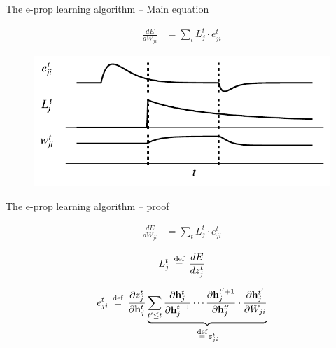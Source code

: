 \documentclass[t]{beamer}
\newcommand\eqdef{\ \mathrel{\overset{\makebox[0pt]{\mbox{\normalfont\scriptsize\rmfamily def}}}{=}}\ }
\begin{document}
\begin{frame}{The e-prop learning algorithm -- Main equation}
	
	\begin{align*}
		\frac{dE}{dW_{ji}} 
		&= \sum_tL_j^t \cdot e_{ji}^t
	\end{align*}
	
	\begin{figure}[!ht]
		\includegraphics[width=0.8\linewidth]{eligibility.pdf}
	\end{figure}
	
\end{frame}

\begin{frame}{The e-prop learning algorithm -- proof}
	
	\begin{align*}
		\frac{dE}{dW_{ji}} 
		&= \sum_tL_j^t \cdot e_{ji}^t
	\end{align*}
	
	\begin{equation*}
L^t_j \eqdef \frac{dE}{dz^t_j}
\end{equation*}

	\begin{equation*}
e^t_{ji} \eqdef \frac{\partial z_j^t}{\partial\mathbf{h}_j^t}\underbrace{\sum_{t'\leq t}\frac{\partial\mathbf{h}^t_j}{\partial\mathbf{h}_j^{t-1}} \cdots \frac{\partial\mathbf{h}_j^{t'+1}}{\partial\mathbf{h}_j^{t'}}\cdot\frac{\partial\mathbf{h}_j^{t'}}{\partial W_{ji}}}_{\eqdef \bm{\varepsilon}_{ji}^t}
\end{equation*}
	
	
\end{frame}
\end{document}
